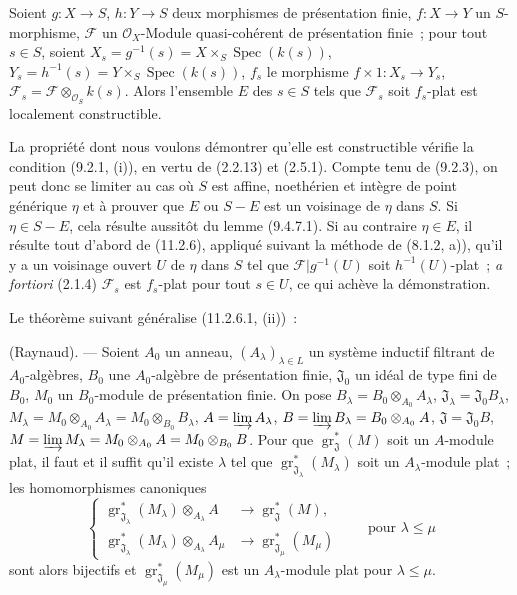 \begin{proposition}[11.2.8]
\label{IV.11.2.8-fr}
Soient $g:X\to S$, $h:Y\to S$ deux morphismes de présentation finie,
$f:X\to Y$ un $S$-morphisme, $\mathcal F$ un
$\mathcal O_X$-Module quasi-cohérent de présentation finie~; pour tout
$s\in S$, soient $X_s=g^{-1}(s)=X\times_S\operatorname{Spec}(k(s))$,
$Y_s=h^{-1}(s)=Y\times_S\operatorname{Spec}(k(s))$, $f_s$ le morphisme
$f\times1:X_s\to Y_s$, $\mathcal F_s=\mathcal F\otimes_{\mathcal O_S}k(s)$.
Alors l'ensemble $E$ des $s\in S$ tels que $\mathcal F_s$ soit $f_s$-plat
est localement constructible.
\end{proposition}

La propriété dont nous voulons démontrer qu'elle est constructible vérifie la
condition (9.2.1, (i)), en vertu de (2.2.13) et (2.5.1). Compte tenu de
(9.2.3), on peut donc se limiter au cas où $S$ est affine, noethérien et
intègre de point générique $\eta$ et à prouver que $E$ ou $S-E$ est un
voisinage de $\eta$ dans $S$. Si $\eta\in S-E$, cela résulte aussitôt du
lemme (9.4.7.1). Si au contraire $\eta\in E$, il résulte tout d'abord de
(11.2.6), appliqué suivant la méthode de (8.1.2, a)), qu'il y a un voisinage
ouvert $U$ de $\eta$ dans $S$ tel que
$\mathcal F|g^{-1}(U)$ soit $h^{-1}(U)$-plat~; \emph{a fortiori} (2.1.4)
$\mathcal F_s$ est $f_s$-plat pour tout $s\in U$, ce qui achève la
démonstration.

Le théorème suivant généralise (11.2.6.1, (ii))~:

\begin{theorem}[11.2.9]
(Raynaud). --- Soient $A_0$ un anneau, $(A_\lambda)_{\lambda\in L}$ un système
inductif filtrant de $A_0$-algèbres, $B_0$ une $A_0$-algèbre de présentation
finie, $\mathfrak J_0$ un idéal de type fini de $B_0$, $M_0$ un $B_0$-module
de présentation finie. On pose
$B_\lambda=B_0\otimes_{A_0}A_\lambda$,
$\mathfrak J_\lambda=\mathfrak J_0B_\lambda$,
$M_\lambda=M_0\otimes_{A_0}A_\lambda=M_0\otimes_{B_0}B_\lambda$,
$A=\varinjlim A_\lambda$,
$B=\varinjlim B_\lambda=B_0\otimes_{A_0}A$,
$\mathfrak J=\mathfrak J_0B$,
$M=\varinjlim M_\lambda=M_0\otimes_{A_0}A=M_0\otimes_{B_0}B$. Pour que
$\operatorname{gr}_{\mathfrak J}^*(M)$ soit un $A$-module plat, il faut et il
suffit qu'il existe $\lambda$ tel que
$\operatorname{gr}_{\mathfrak J_\lambda}^*(M_\lambda)$ soit un
$A_\lambda$-module plat~; les homomorphismes canoniques
\begin{equation}
\left\{
\begin{aligned}
\operatorname{gr}_{\mathfrak J_\lambda}^*(M_\lambda)
  \otimes_{A_\lambda}A&\longrightarrow
  \operatorname{gr}_{\mathfrak J}^*(M),\\
\operatorname{gr}_{\mathfrak J_\lambda}^*(M_\lambda)
  \otimes_{A_\lambda}A_\mu&\longrightarrow
  \operatorname{gr}_{\mathfrak J_\mu}^*(M_\mu)
\end{aligned}
\right.
\qquad\text{pour }\lambda\leq\mu
\label{IV.11.2.9.1-fr}
\tag{11.2.9.1}
\end{equation}
sont alors bijectifs et
$\operatorname{gr}_{\mathfrak J_\mu}^*(M_\mu)$ est un $A_\lambda$-module plat
pour $\lambda\leq\mu$.
\end{theorem}

